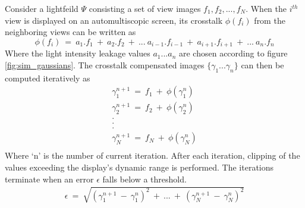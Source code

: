 Consider a lightfeild $\Psi$ consisting a set of view images ${f_1, f_2, ..., f_N}$. When the $i^{th}$ view is displayed on an automultiscopic screen, its crosstalk $\phi(f_i)$ from the neighboring views can be written as
\begin{equation}
\phi(f_i)\:=\: a_1.f_1\:+\:a_2.f_2\:+\:...\:a_{i-1}.f_{i-1}\:+\:a_{i+1}.f_{i+1}\:+\:...\:a_n.f_n
\end{equation}
Where the light intensity leakage values $a_1...a_n$ are chosen according to figure \ref{fig:sim_gaussians}. The crosstalk compensated images $\{\gamma_1...\gamma_n\}$ can then be computed iteratively as
\begin{equation}
\begin{aligned}
\gamma_1^{n+1} \:=\: f_1 \:+\: \phi(\gamma_1^n) \\
\gamma_2^{n+1} \:=\: f_2 \:+\: \phi(\gamma_2^n) \\
.\:\:\:\:\:\:\:\:\:\:\:\:\:\:\:\:\:\:\:\:\:\:\:\:\:\:\:\:\:\:\:\:\:\:\:\:\:\ \\
.\:\:\:\:\:\:\:\:\:\:\:\:\:\:\:\:\:\:\:\:\:\:\:\:\:\:\:\:\:\:\:\:\:\:\:\:\:\ \\
.\:\:\:\:\:\:\:\:\:\:\:\:\:\:\:\:\:\:\:\:\:\:\:\:\:\:\:\:\:\:\:\:\:\:\:\:\:\ \\
\gamma_N^{n+1} \:=\: f_N \:+\: \phi(\gamma_N^n) \\
\end{aligned}
\end{equation}
Where `n' is the number of current iteration. After each iteration, clipping of the values exceeding the display's dynamic range is performed. The iterations terminate when an error $\epsilon$ falls below a threshold.
\begin{equation}
\begin{aligned}
\epsilon \:=\: \sqrt{(\gamma_1^{n+1}\:-\:\gamma_1^n)^2 \:+\: ...\:+\:(\gamma_N^{n+1}\:-\:\gamma_N^n)^2}
\end{aligned}
\end{equation}

